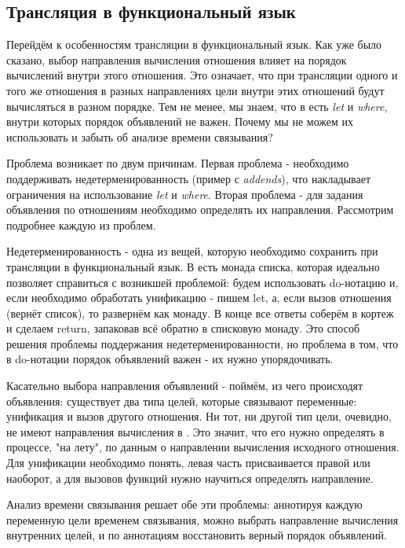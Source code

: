 \documentclass[conference]{IEEEtran}
\begin{document}
\subsection{Трансляция в функциональный язык}

Перейдём к особенностям трансляции в функциональный язык. Как уже было сказано, выбор направления вычисления отношения влияет на порядок вычислений внутри этого отношения. Это означает, что при трансляции одного и того же отношения в разных направлениях цели внутри этих отношений будут вычисляться в разном порядке. Тем не менее, мы знаем, что в \haskell есть \emph{let} и \emph{where}, внутри которых порядок объявлений не важен. Почему мы не можем их использовать и забыть об анализе времени связывания?

Проблема возникает по двум причинам. Первая проблема - необходимо поддерживать недетерменированность (пример с \emph{addends}), что накладывает ограничения на использование \emph{let} и \emph{where}. Вторая проблема - для задания объявления по отношениям необходимо определять их направления. Рассмотрим подробнее каждую из проблем.

Недетерменированность - одна из вещей, которую необходимо сохранить при трансляции в функциональный язык. В \haskell есть монада списка, которая идеально позволяет справиться с возникшей проблемой: будем использовать do-нотацию и, если необходимо обработать унификацию - пишем let, а, если вызов отношения (вернёт список), то развернём как монаду. В конце все ответы соберём в кортеж и сделаем return, запаковав всё обратно в списковую монаду. Это способ решения проблемы поддержания недетерменированности, но проблема в том, что в do-нотации порядок объявлений важен - их нужно упорядочивать.

Касательно выбора направления объявлений - поймём, из чего происходят объявления: существует два типа целей, которые связывают переменные: унификация и вызов другого отношения. Ни тот, ни другой тип цели, очевидно, не имеют направления вычисления в \miniKanren. Это значит, что его нужно определять в процессе, "на лету", по данным о направлении вычисления исходного отношения. Для унификации необходимо понять, левая часть присваивается правой или наоборот, а для вызовов функций нужно научиться определять направление.

Анализ времени связывания решает обе эти проблемы: аннотируя каждую переменную цели временем связывания, можно выбрать направление вычисления внутренних целей, и по аннотациям восстановить верный порядок объявлений.
\end{document}
